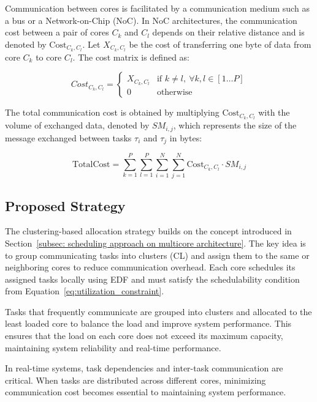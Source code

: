 \documentclass[conference]{IEEEtran}
\begin{document}
Communication between cores is facilitated by a communication medium such as a bus or a Network-on-Chip (NoC). In NoC architectures, the communication cost between a pair of cores $C_k$ and $C_l$ depends on their relative distance and is denoted by $\text{Cost}_{C_k,C_l}$. Let $X_{C_k,C_l}$ be the cost of transferring one byte of data from core $C_k$ to core $C_l$. The cost matrix is defined as:

\begin{equation}
Cost_{C_k, C_l} = 
\begin{cases} 
X_{C_k, C_l} & \text{if } k \ne l,\ \forall k, l \in [1 \dots P] \\
0 & \text{otherwise}
\end{cases}
\end{equation}


The total communication cost is obtained by multiplying $\text{Cost}_{C_k,C_l}$ with the volume of exchanged data, denoted by $SM_{i,j}$, which represents the size of the message exchanged between tasks $\tau_i$ and $\tau_j$ in bytes:

\begin{equation}
\text{TotalCost} = \sum_{k=1}^{P} \sum_{l=1}^{P} \sum_{i=1}^{N} \sum_{j=1}^{N} \text{Cost}_{C_k, C_l} \cdot SM_{i,j}
\label{eq:total_cost}
\end{equation}

\subsection{Proposed Strategy}
\label{subsec: proposed strategy}

The clustering-based allocation strategy builds on the concept introduced in Section~\ref{subsec: scheduling approach on multicore architecture}. The key idea is to group communicating tasks into clusters (CL) and assign them to the same or neighboring cores to reduce communication overhead. Each core schedules its assigned tasks locally using EDF and must satisfy the schedulability condition from Equation~\ref{eq:utilization_constraint}.

Tasks that frequently communicate are grouped into clusters and allocated to the least loaded core to balance the load and improve system performance. This ensures that the load on each core does not exceed its maximum capacity, maintaining system reliability and real-time performance.

In real-time systems, task dependencies and inter-task communication are critical. When tasks are distributed across different cores, minimizing communication cost becomes essential to maintaining system performance.
\end{document}
